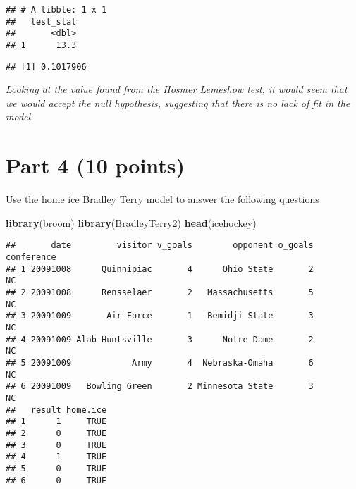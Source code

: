 \documentclass[]{article}
\newenvironment{Shaded}{\begin{snugshade}}{\end{snugshade}}
\newcommand{\DataTypeTok}[1]{\textcolor[rgb]{0.13,0.29,0.53}{#1}}
\newcommand{\DecValTok}[1]{\textcolor[rgb]{0.00,0.00,0.81}{#1}}
\newcommand{\KeywordTok}[1]{\textcolor[rgb]{0.13,0.29,0.53}{\textbf{#1}}}
\newcommand{\NormalTok}[1]{#1}
\newcommand{\OperatorTok}[1]{\textcolor[rgb]{0.81,0.36,0.00}{\textbf{#1}}}
\newcommand{\OtherTok}[1]{\textcolor[rgb]{0.56,0.35,0.01}{#1}}
\newcommand{\StringTok}[1]{\textcolor[rgb]{0.31,0.60,0.02}{#1}}
\begin{document}
\begin{Shaded}
\end{Shaded}

\begin{verbatim}
## # A tibble: 1 x 1
##   test_stat
##       <dbl>
## 1      13.3
\end{verbatim}

\begin{Shaded}
\end{Shaded}

\begin{verbatim}
## [1] 0.1017906
\end{verbatim}

\emph{Looking at the value found from the Hosmer Lemeshow test, it would
seem that we would accept the null hypothesis, suggesting that there is
no lack of fit in the model.}

\hypertarget{part-4-10-points}{%
\section{Part 4 (10 points)}\label{part-4-10-points}}

Use the home ice Bradley Terry model to answer the following questions

\begin{Shaded}
\begin{Highlighting}[]
\KeywordTok{library}\NormalTok{(broom)}
\KeywordTok{library}\NormalTok{(BradleyTerry2)}
\KeywordTok{head}\NormalTok{(icehockey)}
\end{Highlighting}
\end{Shaded}

\begin{verbatim}
##       date         visitor v_goals        opponent o_goals conference
## 1 20091008      Quinnipiac       4      Ohio State       2         NC
## 2 20091008      Rensselaer       2   Massachusetts       5         NC
## 3 20091009       Air Force       1   Bemidji State       3         NC
## 4 20091009 Alab-Huntsville       3      Notre Dame       2         NC
## 5 20091009            Army       4  Nebraska-Omaha       6         NC
## 6 20091009   Bowling Green       2 Minnesota State       3         NC
##   result home.ice
## 1      1     TRUE
## 2      0     TRUE
## 3      0     TRUE
## 4      1     TRUE
## 5      0     TRUE
## 6      0     TRUE
\end{verbatim}
\end{document}
